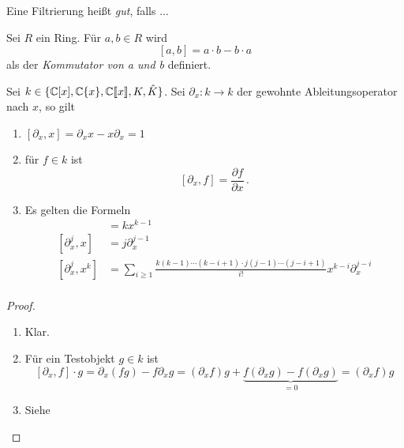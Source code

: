 \begin{defn}
\cite{ayoubIntro}
\cite[Def 3.2.1]{sabbah_cimpa90}
Eine Filtrierung heißt \emph{gut}, falls ...
\end{defn}

\begin{defn}[Kommutator]%
Sei $R$ ein Ring. Für $a,b\in R$ wird
\[[a,b]=a\cdot b-b\cdot a\]
als der \emph{Kommutator von a und b} definiert.
\end{defn}

\begin{prop} \label{prop:d-modul-komutator-regeln}
Sei $k\in \{ \mathbb{C}[x],{\mathbb C \{x\}},{\mathbb C\llbracket x\rrbracket},K,\hat K \}$.
Sei $\partial_x:k\rightarrow k$ der gewohnte Ableitungsoperator
nach $x$, so gilt 
\begin{enumerate}
\item $[ \partial_x,x] = \partial_xx-x\partial_x=1 $
\item für $f\in k$ ist
\[ [\partial_x,f] = \frac{\partial f}{\partial x} \,. \]
\item Es gelten die Formeln\\
\begin{align*}
[\partial_x,x^k]   &= kx^{k-1}\\
[\partial_x^j,x]   &= j\partial_x^{j-1}\\
[\partial_x^j,x^k] &= \sum_{i\geq1}\frac{k(k-1)\cdots(k-i+1)
  \cdot j(j-1)\cdots(j-i+1)}{i!}x^{k-i}\partial_x^{j-i} \\
\end{align*}
\end{enumerate}
\end{prop}
\begin{proof}
\begin{enumerate}
\item Klar.
\item Für ein Testobjekt $g\in k$ ist
\[
[\partial_x,f]\cdot g=\partial_x(fg)-f\partial_xg=
  (\partial_xf)g+\underset{=0}{\underbrace{ 
  f(\partial_xg)-f(\partial_xg)}}=
  (\partial_xf)g
\]
\item Siehe \cite[???]{ZulaBarbara}
\end{enumerate}
\end{proof}


